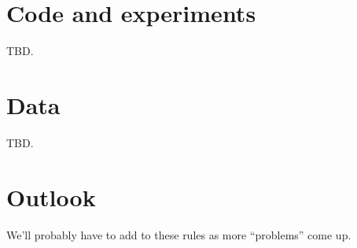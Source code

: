 \documentclass[11pt]{article}
\begin{document}
\section{Code and experiments}
TBD.

\section{Data}
TBD.

\section{Outlook}
We'll probably have to add to these rules as more ``problems'' come up.



\end{document}
